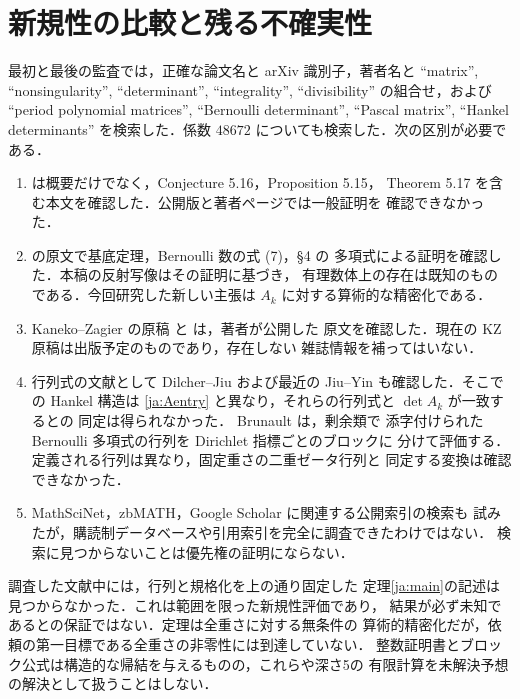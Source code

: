 \documentclass[12pt]{amsart}
\theoremstyle{definition}
\theoremstyle{remark}
\numberwithin{equation}{section}
\theoremstyle{definition}
\theoremstyle{remark}
\begin{document}
\section{新規性の比較と残る不確実性}\label{ja:audit}
最初と最後の監査では，正確な論文名と arXiv 識別子，著者名と
``matrix'', ``nonsingularity'', ``determinant'', ``integrality'',
``divisibility'' の組合せ，および ``period polynomial matrices'',
``Bernoulli determinant'', ``Pascal matrix'', ``Hankel determinants''
を検索した．係数 $48672$ についても検索した．次の区別が必要である．
\begin{enumerate}
\item \cite{jBR} は概要だけでなく，Conjecture 5.16，Proposition 5.15，
Theorem 5.17 を含む本文を確認した．公開版と著者ページでは一般証明を
確認できなかった．
\item \cite{jGKZ} の原文で基底定理，Bernoulli 数の式 (7)，\S4 の
多項式による証明を確認した．本稿の反射写像はその証明に基づき，
有理数体上の存在は既知のものである．今回研究した新しい主張は
$A_k$ に対する算術的な精密化である．
\item Kaneko--Zagier の原稿 \cite{jKZ} と \cite{jIKZ} は，著者が公開した
原文を確認した．現在の KZ 原稿は出版予定のものであり，存在しない
雑誌情報を補ってはいない．
\item 行列式の文献として Dilcher--Jiu \cite{jDJ} および最近の
Jiu--Yin \cite{jJY} も確認した．そこでの Hankel 構造は
\eqref{ja:Aentry} と異なり，それらの行列式と $\det A_k$ が一致するとの
同定は得られなかった．
Brunault \cite[$D_{k,N}$ の定義，Theorem 4.1]{jBru} は，剰余類で
添字付けられた Bernoulli 多項式の行列を Dirichlet 指標ごとのブロックに
分けて評価する．定義される行列は異なり，固定重さの二重ゼータ行列と
同定する変換は確認できなかった．
\item MathSciNet，zbMATH，Google Scholar に関連する公開索引の検索も
試みたが，購読制データベースや引用索引を完全に調査できたわけではない．
検索に見つからないことは優先権の証明にならない．
\end{enumerate}
調査した文献中には，行列と規格化を上の通り固定した
定理\ref{ja:main}の記述は見つからなかった．これは範囲を限った新規性評価であり，
結果が必ず未知であるとの保証ではない．定理は全重さに対する無条件の
算術的精密化だが，依頼の第一目標である全重さの非零性には到達していない．
整数証明書とブロック公式は構造的な帰結を与えるものの，これらや深さ5の
有限計算を未解決予想の解決として扱うことはしない．

\appendix
\renewcommand{\theHsection}{ja.appendix.\Alph{section}}
\end{document}
